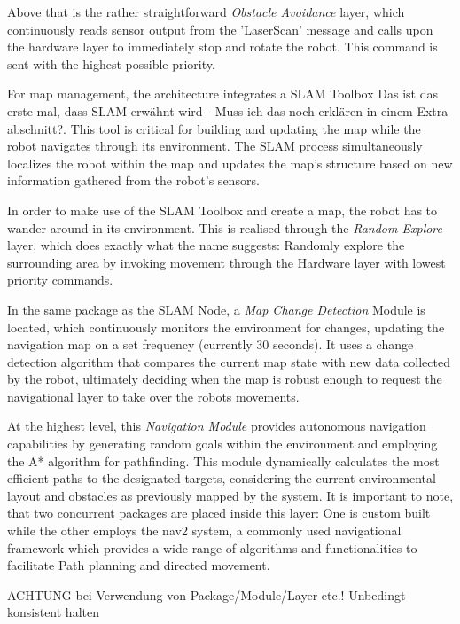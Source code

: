 \documentclass[]{article}
\begin{document}
	Above that is the rather straightforward \textit{Obstacle Avoidance} layer, which continuously reads sensor output from the 'LaserScan' message \autocite{ros.orgLaserScanMessage2024a} and calls upon the hardware layer to immediately stop and rotate the robot. This command is sent with the highest possible priority. 
	
	For map management, the architecture integrates a SLAM Toolbox {\color{red} Das ist das erste mal, dass SLAM erwähnt wird - Muss ich das noch erklären in einem Extra abschnitt?}. This tool is critical for building and updating the map while the robot navigates through its environment. The SLAM process simultaneously localizes the robot within the map and updates the map's structure based on new information gathered from the robot's sensors.
	
	In order to make use of the SLAM Toolbox and create a map, the robot has to wander around in its environment. This is realised through the \textit{Random Explore} layer, which does exactly what the name suggests: Randomly explore the surrounding area by invoking movement through the Hardware layer with lowest priority commands. 
	
	In the same package as the SLAM Node, a \textit{Map Change Detection} Module is located, which continuously monitors the environment for changes, updating the navigation map on a set frequency (currently 30 seconds). It uses a change detection algorithm that compares the current map state with new data collected by the robot, ultimately deciding when the map is robust enough to request the navigational layer to take over the robots movements. 
	
	At the highest level, this \textit{Navigation Module} provides autonomous navigation capabilities by generating random goals within the environment and employing the A* algorithm for pathfinding. This module dynamically calculates the most efficient paths to the designated targets, considering the current environmental layout and obstacles as previously mapped by the system. It is important to note, that two concurrent packages are placed inside this layer: One is custom built while the other employs the nav2 system, a commonly used navigational framework which provides a wide range of algorithms and functionalities to facilitate Path planning and directed movement. \autocite{macenskiMarathonNavigationSystem2020}
	
	{\color{red} ACHTUNG bei Verwendung von Package/Module/Layer etc.! Unbedingt konsistent halten}
			
\end{document}
